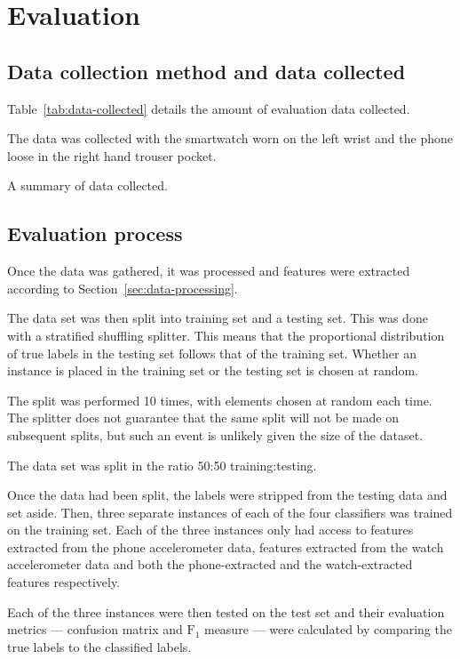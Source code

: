\chapter{Evaluation}
  \section{Data collection method and data collected}
    Table~\ref{tab:data-collected} details the amount of evaluation data collected.
    
    The data was collected with the smartwatch worn on the left wrist and the phone loose in the right hand trouser pocket.
    \begin{table}
      \centering
        
      \caption{A summary of data collected.}
      \label{tab:data-collected}
    \end{table}
  \section{Evaluation process}
    Once the data was gathered, it was processed and features were extracted according to Section~\ref{sec:data-processing}.
    
    The data set was then split into training set and a testing set. This was done with a stratified shuffling splitter. This means that the proportional distribution of true labels in the testing set follows that of the training set. Whether an instance is placed in the training set or the testing set is chosen at random.
    
    The split was performed 10 times, with elements chosen at random each time. The splitter does not guarantee that the same split will not be made on subsequent splits, but such an event is unlikely given the size of the dataset.
    
    The data set was split in the ratio 50:50 training:testing.
    
    Once the data had been split, the labels were stripped from the testing data and set aside. Then, three separate instances of each of the four classifiers was trained on the training set. Each of the three instances only had access to features extracted from the phone accelerometer data, features extracted from the watch accelerometer data and both the phone-extracted and the watch-extracted features respectively.
    
    Each of the three instances were then tested on the test set and their evaluation metrics --- confusion matrix and $\mathrm{F}_1$ measure --- were calculated by comparing the true labels to the classified labels.
